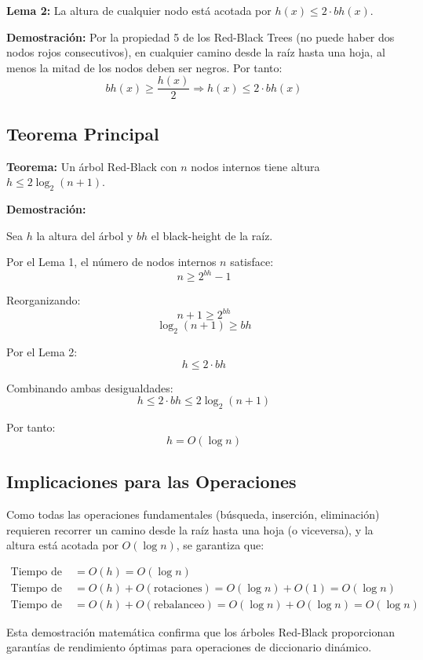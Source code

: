 \documentclass[conference]{IEEEtran}
\begin{document}
\textbf{Lema 2:} La altura de cualquier nodo está acotada por $h(x) \leq 2 \cdot bh(x)$.

\textbf{Demostración:} Por la propiedad 5 de los Red-Black Trees (no puede haber dos nodos rojos consecutivos), en cualquier camino desde la raíz hasta una hoja, al menos la mitad de los nodos deben ser negros. Por tanto:
$$bh(x) \geq \frac{h(x)}{2} \Rightarrow h(x) \leq 2 \cdot bh(x)$$

\subsection{Teorema Principal}

\textbf{Teorema:} Un árbol Red-Black con $n$ nodos internos tiene altura $h \leq 2\log_2(n+1)$.

\textbf{Demostración:}

Sea $h$ la altura del árbol y $bh$ el black-height de la raíz.

Por el Lema 1, el número de nodos internos $n$ satisface:
$$n \geq 2^{bh} - 1$$

Reorganizando:
$$n + 1 \geq 2^{bh}$$
$$\log_2(n + 1) \geq bh$$

Por el Lema 2:
$$h \leq 2 \cdot bh$$

Combinando ambas desigualdades:
$$h \leq 2 \cdot bh \leq 2\log_2(n + 1)$$

Por tanto: $$h = O(\log n)$$

\subsection{Implicaciones para las Operaciones}

Como todas las operaciones fundamentales (búsqueda, inserción, eliminación) requieren recorrer un camino desde la raíz hasta una hoja (o viceversa), y la altura está acotada por $O(\log n)$, se garantiza que:

\begin{align}
\text{Tiempo de búsqueda} &= O(h) = O(\log n) \\
\text{Tiempo de inserción} &= O(h) + O(\text{rotaciones}) = O(\log n) + O(1) = O(\log n) \\
\text{Tiempo de eliminación} &= O(h) + O(\text{rebalanceo}) = O(\log n) + O(\log n) = O(\log n)
\end{align}

Esta demostración matemática confirma que los árboles Red-Black proporcionan garantías de rendimiento óptimas para operaciones de diccionario dinámico.
\end{document}
